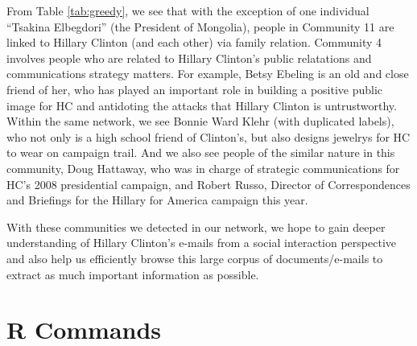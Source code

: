 \documentclass[11pt]{article}
\begin{document}
From Table \ref{tab:greedy}, we see that with the exception of one individual ``Tsakina Elbegdori'' (the President of Mongolia), people in Community 11 are linked to Hillary Clinton (and each other) via family relation. Community 4 involves people who are related to Hillary Clinton's public relatations and communications strategy matters. For example, Betsy Ebeling is an old and close friend of her, who has played an important role in building a positive public image for HC and antidoting the attacks that Hillary Clinton is untrustworthy. Within the same network, we see Bonnie Ward Klehr (with duplicated labels), who not only is a high school friend of Clinton's, but also designs jewelrys for HC to wear on campaign trail. And we also see people of the similar nature in this community, Doug Hattaway, who was in charge of strategic communications for HC's 2008 presidential campaign, and Robert Russo, Director of Correspondences and Briefings for the Hillary for America campaign this year. 

With these communities we detected in our network, we hope to gain deeper understanding of Hillary Clinton's e-mails from a social interaction perspective and also help us efficiently browse this large corpus of documents/e-mails to extract as much important information as possible. 
\clearpage
\appendix
\section{R Commands} \label{App:AppendixA}
\clearpage
\end{document}

